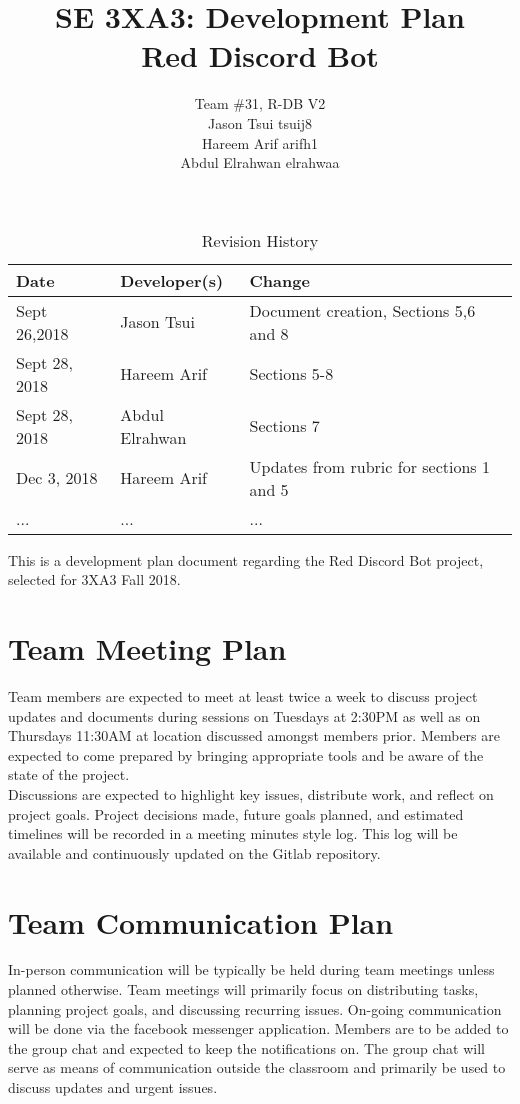 \documentclass[12pt]{article}
\title{SE 3XA3: Development Plan\\Red Discord Bot}
\author{Team \#31, R-DB V2
		\\ Jason Tsui tsuij8
		\\ Hareem Arif arifh1
		\\ Abdul Elrahwan elrahwaa
}
\date{}
\begin{document}
\begin{table}[hp]
\caption{Revision History} \label{TblRevisionHistory}
\begin{tabularx}{\textwidth}{llX}
\toprule
\textbf{Date} & \textbf{Developer(s)} & \textbf{Change}\\
\midrule
Sept 26,2018 & Jason Tsui & Document creation, Sections 5,6 and 8\\
Sept 28, 2018 & Hareem Arif & Sections 5-8\\
Sept 28, 2018 & Abdul Elrahwan & Sections 7\\
Dec 3, 2018 & Hareem Arif & Updates from rubric for sections 1 and 5\\
... & ... & ...\\
\bottomrule
\end{tabularx}
\end{table}




\newpage

\maketitle
This is a development plan document regarding the Red Discord Bot project, selected for 3XA3 Fall 2018.

\section{Team Meeting Plan}
\tab Team members are expected to meet at least twice a week to discuss project updates and documents during sessions on Tuesdays at 2:30PM as well as on Thursdays 11:30AM at location discussed amongst members prior. Members are expected to come prepared by bringing appropriate tools and be aware of the state of the project.\\

Discussions are expected to highlight key issues, distribute work, and reflect on project goals. Project decisions made, future goals planned, and estimated timelines will be recorded in a meeting minutes style log. This log will be available and continuously updated on the Gitlab repository.




\section{Team Communication Plan}

\tab In-person communication will be typically be held during team meetings unless planned otherwise. Team meetings will primarily focus on distributing tasks, planning project goals, and discussing recurring issues. On-going communication will be done via the facebook messenger application. Members are to be added to the group chat and expected to keep the notifications on. The group chat will serve as means of communication outside the classroom and primarily be used to discuss updates and urgent issues.
\end{document}

